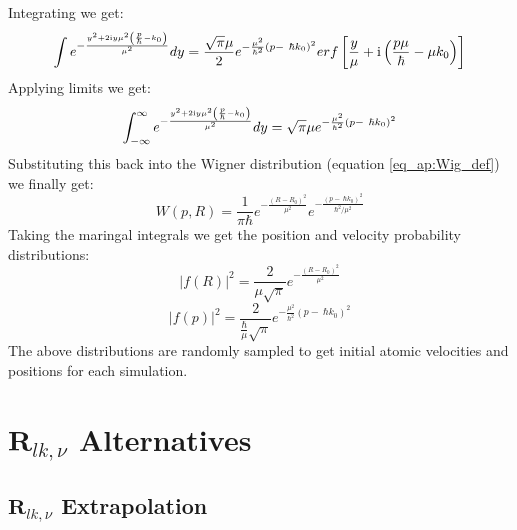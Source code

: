 Integrating we get:
\begin{equation}
  \int e^{-\frac{y^2 + 2 \mathrm{i} y\mu^{2}\left( \frac{p}{\hbar} - k_0\right)}{\mu^{2}}  } dy = \frac{\sqrt{\pi} \mu}{2} e^{-\frac{\mu^2}{\hbar^2} (p - \ \hbar k_0)^2} erf\left[\frac{y}{\mu} + \mathrm{i} \left(\frac{p \mu}{\hbar} - \mu k_0 \right)\right]
   \label{eq_ap:step4}
\end{equation}
Applying limits we get:
\begin{equation}
  \int_{-\infty}^{\infty} e^{-\frac{y^2 + 2 \mathrm{i} y\mu^{2}\left( \frac{p}{\hbar} - k_0\right)}{\mu^{2}}  } dy = \sqrt{\pi} \mu e^{-\frac{\mu^2}{\hbar^2} \left(p - \ \hbar k_0 \right)^2}
  \label{eq_ap:step5}
\end{equation}
Substituting this back into the Wigner distribution (equation \eqref{eq_ap:Wig_def}) we finally get:
\begin{equation}
  W(p, R) = \frac{1}{\pi \hbar} e^{-\frac{(R - R_0)^2}{\mu^2}} e^{-\frac{\left(p - \ \hbar k_0 \right)^2}{\hbar^2/\mu^2}}
  \label{eq_ap:step6}
\end{equation}
Taking the maringal integrals we get the position and velocity probability distributions:
\begin{equation}
  \vert f(R)\vert^2 = \frac{2}{\mu \sqrt{\pi}} e^{- \frac{(R - R_0)^2}{\mu^2}}
\end{equation}
\begin{equation}
  \vert f(p)\vert^2 = \frac{2}{\frac{\hbar}{\mu} \sqrt{\pi}} e^{- \frac{\mu^2}{\hbar^2}(p - \ \hbar k_0)^2}
\end{equation}
The above distributions are randomly sampled to get initial atomic velocities and positions for each simulation.

\chapter{$\mathbf{R}_{lk, \nu}$ Alternatives}
\label{ap:RlkAlternatives}
\section{$\mathbf{R}_{lk, \nu}$ Extrapolation}
\label{ap:RlkExtrap}

